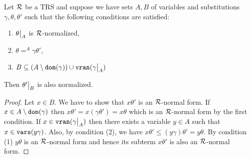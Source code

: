 \begin{proposition}\label{proposition:change-of-domain-normalized}
	Let $\mathcal{R}$ be a TRS and suppose we have sets $A,B$ of variables and substitutions $\gamma, \theta, \theta'$ such that the following consditions are satisfied:
	\begin{enumerate}
		\item $\restr{\theta}{A}$ is $\mathcal{R}$-normalized,
		\item $\theta =^A \gamma \theta'$,
		\item $B \subseteq (A \setminus \dom{\gamma}) \cup \vran{\restr{\gamma}{A}}$
	\end{enumerate}
	Then $\restr{\theta'}{B}$ is also normalized.
	\begin{proof}
		Let $x \in B$. We have to show that $x\theta'$ is an $\mathcal{R}$-normal form. If $x \in A \setminus \mathtt{dom}(\gamma)$ then $x\theta' = x(\gamma\theta') = x\theta$ which is an $\mathcal{R}$-normal form by the first condition. If $x \in \vran{\restr{\gamma}{A}}$ then there exists a variable $y \in A$ such that $x \in \mathtt{vars}(y\gamma)$. Also, by condition (2), we have $x\theta' \leq (y\gamma)\theta' = y\theta$. By condition (1) $y\theta$ is an $\mathcal{R}$-normal form and hence its subterm $x\theta'$ is also an $\mathcal{R}$-normal form.
	\end{proof}
\end{proposition}

